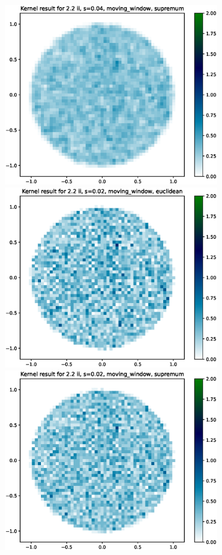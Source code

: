 \documentclass{article}
\begin{document}
\includegraphics[height=8cm]{comparisons//Kernel_result_2-2ii_s_0-04_moving_window_supremum.eps} \\
\hspace*{-1.5cm}\includegraphics[height=8cm]{comparisons//Kernel_result_2-2ii_s_0-02_moving_window_euclidean.eps} \hspace*{-1.5cm}
\includegraphics[height=8cm]{comparisons//Kernel_result_2-2ii_s_0-02_moving_window_supremum.eps}\\
\end{document}
